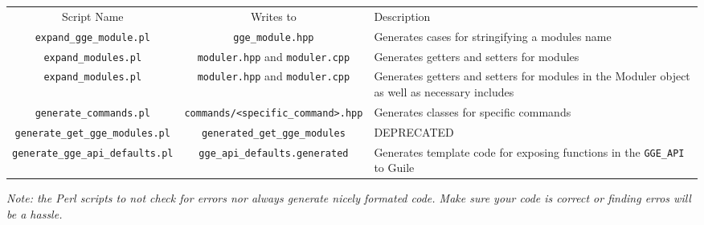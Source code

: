 \begin{adjustbox}{width=\paperwidth}
\begin{tabular}{|c|c|l|}
	Script Name & Writes to & Description \\
	\verb|expand_gge_module.pl| & \verb|gge_module.hpp| & Generates cases for stringifying a modules name \\
	\verb|expand_modules.pl| & \verb|moduler.hpp| and \verb|moduler.cpp| & 
	Generates getters and setters for modules \\
	\verb|expand_modules.pl| & \verb|moduler.hpp| and \verb|moduler.cpp| & 
	Generates getters and setters for modules in the Moduler object as well as necessary includes \\
	\verb|generate_commands.pl| & \verb|commands/<specific_command>.hpp| & 
	Generates classes for specific commands\\
	\verb|generate_get_gge_modules.pl| & \verb|generated_get_gge_modules| & 
	DEPRECATED \\
	\verb|generate_gge_api_defaults.pl| & \verb|gge_api_defaults.generated| & 
	Generates template code for exposing functions in the \verb|GGE_API| to Guile \\
\end{tabular}
\end{adjustbox}

\textit{
	Note: the Perl scripts to not check for errors nor always generate nicely formated code.
	Make sure your code is correct or finding erros will be a hassle.
}
